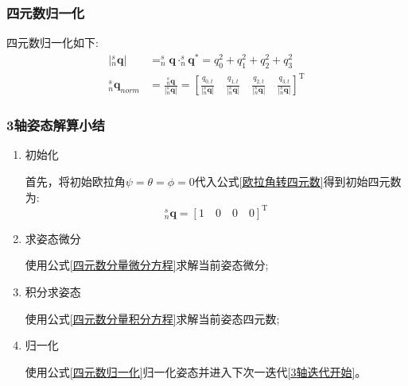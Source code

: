 \documentclass[12pt,a4paper]{article}
\begin{document}
\subsubsection{四元数归一化}
四元数归一化如下:
\begin{equation}\label{四元数归一化}
    \begin{split}
        |^s_n\bm{q}|&=^s_n\bm{q} \cdot ^s_n\bm{q}^*={q_0^2+q_1^2+q_2^2+q_3^2}\\ 
        ^s_n\bm{q}_{norm}&=\frac{^s_n\bm{q}}{|^s_n\bm{q}|}
        =\left[\frac{q_{0,t}}{|^s_n\bm{q}|}\quad
            \frac{q_{1,t}}{|^s_n\bm{q}|}\quad
            \frac{q_{2,t}}{|^s_n\bm{q}|}\quad
             \frac{q_{3,t}}{|^s_n\bm{q}|}\right]^\mathrm{T}
    \end{split}
\end{equation} 

\subsubsection{3轴姿态解算小结}\label{section:3轴姿态解算小结}
\begin{enumerate}
        \item 初始化 
            
            首先，将初始欧拉角$\psi=\theta=\phi=0$代入公式\ref{欧拉角转四元数}得到初始四元数为:
            \begin{equation}\label{四元数初始化}
                ^s_n\bm{q}=[1\quad 0\quad 0\quad 0]^\mathrm{T}
            \end{equation} 

        \item 求姿态微分\label{3轴迭代开始}
            
            使用公式\ref{四元数分量微分方程}求解当前姿态微分;

        \item 积分求姿态
            
            使用公式\ref{四元数分量积分方程}求解当前姿态四元数; 

        \item 归一化 
            
            使用公式\ref{四元数归一化}归一化姿态并进入下次一迭代\ref{3轴迭代开始}。
\end{enumerate}
\end{document}
